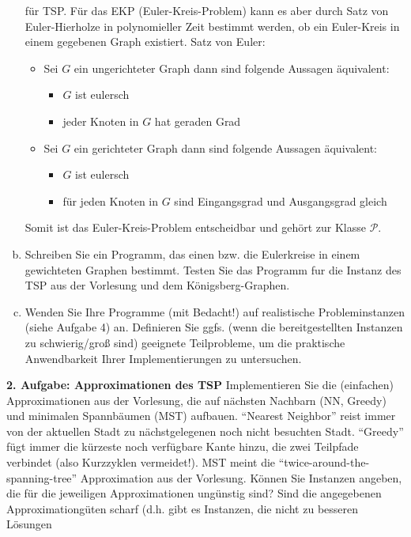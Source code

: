 \documentclass{article}
\begin{document}
\begin{flushleft}
\begin{enumerate}[(a)]
für TSP.
\newline
Für das EKP (Euler-Kreis-Problem) kann es aber durch Satz von Euler-Hierholze in polynomieller Zeit bestimmt werden, 
ob ein Euler-Kreis in einem gegebenen Graph existiert.
\newline
Satz von Euler:
\begin{itemize}
    \item Sei $G$ ein ungerichteter Graph dann sind folgende Aussagen äquivalent:
    \begin{itemize}
        \item $G$ ist eulersch
        \item jeder Knoten in $G$ hat geraden Grad
    \end{itemize}
    \item Sei $G$ ein gerichteter Graph dann sind folgende Aussagen äquivalent:
    \begin{itemize}
        \item $G$ ist eulersch
        \item für jeden Knoten in $G$ sind Eingangsgrad und Ausgangsgrad gleich
    \end{itemize}
\end{itemize}
Somit ist das Euler-Kreis-Problem entscheidbar und gehört zur Klasse $\mathcal{P}$. 
\item Schreiben Sie ein Programm, das einen bzw. die Eulerkreise in einem gewichteten Graphen bestimmt. 
Testen Sie das Programm fur die Instanz des TSP aus der Vorlesung und dem Königsberg-Graphen.
\item Wenden Sie Ihre Programme (mit Bedacht!) auf realistische Probleminstanzen (siehe Aufgabe
4) an. Definieren Sie ggfs. (wenn die bereitgestellten Instanzen zu schwierig/groß sind) geeignete
Teilprobleme, um die praktische Anwendbarkeit Ihrer Implementierungen zu untersuchen.
\end{enumerate}
\textbf{2. Aufgabe: Approximationen des TSP}
\newline
Implementieren Sie die (einfachen) Approximationen aus der Vorlesung, die auf nächsten Nachbarn
(NN, Greedy) und minimalen Spannbäumen (MST) aufbauen. ``Nearest Neighbor'' reist immer
von der aktuellen Stadt zu nächstgelegenen noch nicht besuchten Stadt. ``Greedy'' fügt immer die
kürzeste noch verfügbare Kante hinzu, die zwei Teilpfade verbindet (also Kurzzyklen vermeidet!).
MST meint die ``twice-around-the-spanning-tree'' Approximation aus der Vorlesung.
Können Sie Instanzen angeben, die für die jeweiligen Approximationen ungünstig sind? Sind die
angegebenen Approximationgüten scharf (d.h. gibt es Instanzen, die nicht zu besseren Lösungen

\end{flushleft}
\end{document}
